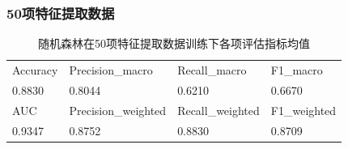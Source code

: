 \documentclass[10pt]{article}
\begin{document}
\subsubsection*{50项特征提取数据}
\begin{table}[H]
  \centering
  \caption{随机森林在50项特征提取数据训练下各项评估指标均值}
  \begin{tabular}{llll}
  \toprule
  Accuracy & Precision\_macro & Recall\_macro & F1\_macro \\
  0.8830 & 0.8044 & 0.6210 & 0.6670 \\
  \midrule
  AUC & Precision\_weighted & Recall\_weighted & F1\_weighted \\
  0.9347 & 0.8752 & 0.8830 & 0.8709 \\
  \bottomrule
  \end{tabular}
\end{table}
\end{document}
